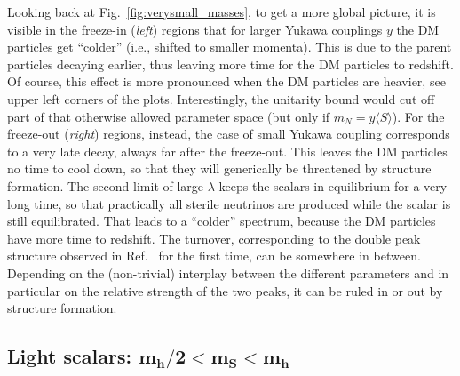 Looking back at Fig.~\ref{fig:verysmall_masses}, to get a more global picture, it is visible in the freeze-in (\emph{left}) regions that for larger Yukawa couplings $y$ the DM particles get ``colder'' (i.e., shifted to smaller momenta). This is due to the parent particles decaying earlier, thus leaving more time for the DM particles to redshift. Of course, this effect is more pronounced when the DM particles are heavier, see upper left corners of the plots. Interestingly, the unitarity bound would cut off part of that otherwise allowed parameter space (but only if $m_N = y \langle S \rangle$). For the freeze-out (\emph{right}) regions, instead, the case of small Yukawa coupling corresponds to a very late decay, always far after the freeze-out. This leaves the DM particles no time to cool down, so that they will generically be threatened by structure formation. The second limit of large $\lambda$ keeps the scalars in equilibrium for a very long time, so that practically all sterile neutrinos are produced while the scalar is still equilibrated. That leads to a ``colder'' spectrum, because the DM particles have more time to redshift. The turnover, corresponding to the double peak structure observed in Ref.~\cite{Merle:2015oja} for the first time, can be somewhere in between. Depending on the (non-trivial) interplay between the different parameters and in particular on the relative strength of the two peaks, it can be ruled in or out by structure formation.






\subsection{\label{sec:Results_Light}Light scalars: $\boldsymbol{m_h/2 < m_S < m_h}$}

